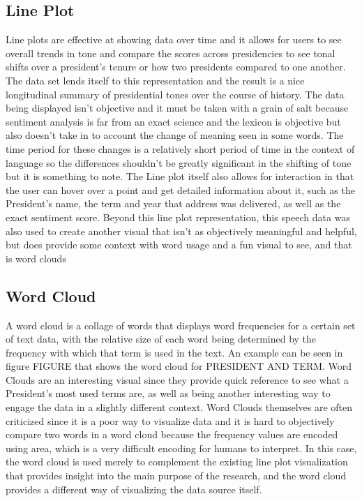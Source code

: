 \subsection{Line Plot}
Line plots are effective at showing data over time and it allows for users to see overall trends in tone and compare the scores across presidencies to see tonal shifts over a president's tenure or how two presidents compared to one another.
The data set lends itself to this representation and the result is a nice longitudinal summary of presidential tones over the course of history.
The data being displayed isn't objective and it must be taken with a grain of salt because sentiment analysis is far from an exact science and the lexicon is objective but also doesn't take in to account the change of meaning seen in some words.
The time period for these changes is a relatively short period of time in the context of language so the differences shouldn't be greatly significant in the shifting of tone but it is something to note.
The Line plot itself also allows for interaction in that the user can hover over a point and get detailed information about it, such as the President's name, the term and year that address was delivered, as well as the exact sentiment score.
Beyond this line plot representation, this speech data was also used to create another visual that isn't as objectively meaningful and helpful, but does provide some context with word usage and a fun visual to see, and that is word clouds

\subsection{Word Cloud}
A word cloud is a collage of words that displays word frequencies for a certain set of text data, with the relative size of each word being determined by the frequency with which that term is used in the text.
An example can be seen in figure FIGURE that shows the word cloud for PRESIDENT AND TERM.
Word Clouds are an interesting visual since they provide quick reference to see what a President's most used terms are, as well as being another interesting way to engage the data in a slightly different context.
Word Clouds themselves are often criticized since it is a poor way to visualize data and it is hard to objectively compare two words in a word cloud because the frequency values are encoded using area, which is a very difficult encoding for humans to interpret.
In this case, the word cloud is used merely to complement the existing line plot visualization that provides insight into the main purpose of the research, and the word cloud provides a different way of visualizing the data source itself.

